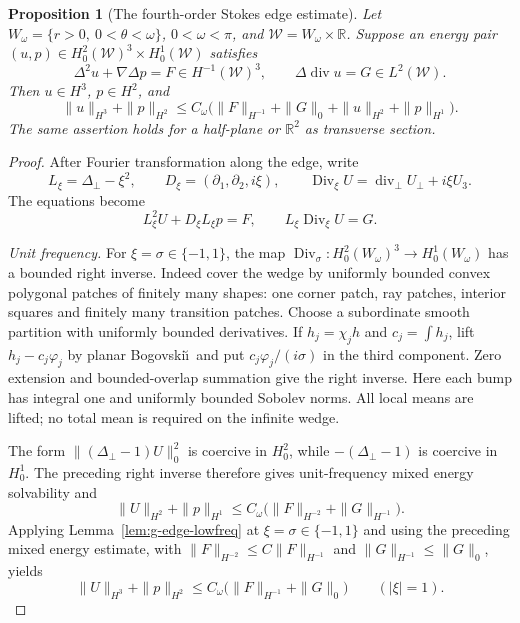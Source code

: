 \documentclass[11pt,a4paper]{article}
\newtheorem{proposition}[theorem]{Proposition}
\theoremstyle{remark}
\numberwithin{equation}{section}
\begin{document}
\begin{proposition}[The fourth-order Stokes edge estimate]\label{prop:g-edge}
Let $W_\omega=\{r>0,\ 0<\theta<\omega\}$, $0<\omega<\pi$, and
$\mathcal W=W_\omega\times\mathbb R$. Suppose an energy pair
$(u,p)\in H^2_0(\mathcal W)^3\times H^1_0(\mathcal W)$ satisfies
\[
 \Delta^2u+\nabla\Delta p=F\in H^{-1}(\mathcal W)^3,
 \qquad \Delta\operatorname{div}u=G\in L^2(\mathcal W).
\]
Then $u\in H^3$, $p\in H^2$, and
\begin{equation}\label{eq:g-edge-estimate}
 \|u\|_{H^3}+\|p\|_{H^2}
 \le C_\omega\bigl(\|F\|_{H^{-1}}+\|G\|_0+
                              \|u\|_{H^2}+\|p\|_{H^1}\bigr).
\end{equation}
The same assertion holds for a half-plane or $\mathbb R^2$ as transverse
section.
\end{proposition}
\begin{proof}
After Fourier transformation along the edge, write
\[
 L_\xi=\Delta_\perp-\xi^2,\qquad
 D_\xi=(\partial_1,\partial_2,i\xi),\qquad
 \operatorname{Div}_\xi U=\operatorname{div}_\perp U_\perp+i\xi U_3.
\]
The equations become
\begin{equation}\label{eq:g-edge-fourier-reduction}
 L_\xi^2U+D_\xi L_\xi p=F,\qquad
 L_\xi\operatorname{Div}_\xi U=G.
\end{equation}

\emph{Unit frequency.}
For $\xi=\sigma\in\{-1,1\}$, the map
$\operatorname{Div}_\sigma:H^2_0(W_\omega)^3\to H^1_0(W_\omega)$ has a
bounded right inverse. Indeed cover the wedge by uniformly bounded convex
polygonal patches of finitely many shapes: one corner patch, ray patches,
interior squares and finitely many transition patches. Choose a subordinate
smooth partition with uniformly bounded derivatives. If $h_j=\chi_jh$ and
$c_j=\int h_j$, lift $h_j-c_j\varphi_j$ by planar Bogovski\u\i\ and put
$c_j\varphi_j/(i\sigma)$ in the third component. Zero extension and
bounded-overlap summation give the right inverse. Here each bump has integral
one and uniformly bounded Sobolev norms. All local means are lifted; no total
mean is required on the infinite wedge.

The form $\|(\Delta_\perp-1)U\|_0^2$ is coercive in $H^2_0$, while
$-(\Delta_\perp-1)$ is coercive in $H^1_0$. The preceding right inverse
therefore gives unit-frequency mixed energy solvability and
\[
 \|U\|_{H^2}+\|p\|_{H^1}
 \le C_\omega\bigl(\|F\|_{H^{-2}}+\|G\|_{H^{-1}}\bigr).
\]
Applying Lemma~\ref{lem:g-edge-lowfreq} at $\xi=\sigma\in\{-1,1\}$ and
using the preceding mixed energy estimate, with
$\|F\|_{H^{-2}}\le C\|F\|_{H^{-1}}$ and
$\|G\|_{H^{-1}}\le\|G\|_0$, yields
\begin{equation}\label{eq:g-edge-unit-estimate}
 \|U\|_{H^3}+\|p\|_{H^2}
 \le C_\omega\bigl(\|F\|_{H^{-1}}+\|G\|_0\bigr)
 \qquad(|\xi|=1).
\end{equation}


\end{proof}
\end{document}
